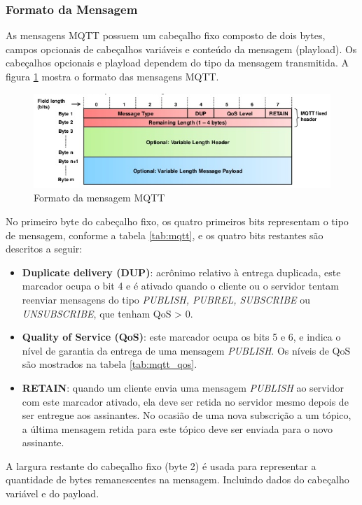 \subsubsection{Formato da Mensagem}

As mensagens MQTT possuem um cabeçalho fixo composto de dois bytes,
campos opcionais de cabeçalhos variáveis e conteúdo da mensagem (playload).
Os cabeçalhos opcionais e playload dependem do tipo da mensagem transmitida.
A figura \ref{fig:mqtt-1} mostra o formato das mensagens MQTT.

\begin{figure}[h]
\begin{centering}
\includegraphics[width=1\linewidth]{Imagens/Cap_2/mqtt_message}
\par\end{centering}
\caption{Formato da mensagem MQTT \cite{img:mqtt:peter}\label{fig:mqtt-1}}
\end{figure}
 

No primeiro byte do cabeçalho fixo, os quatro primeiros bits representam
o tipo de mensagem, conforme a tabela \ref{tab:mqtt}, e os quatro
bits restantes são descritos a seguir:
\begin{itemize}
\item \textbf{Duplicate delivery (DUP)}: acrônimo relativo à entrega duplicada,
este marcador ocupa o bit 4 e é ativado quando o cliente ou o servidor
tentam reenviar mensagens do tipo \emph{PUBLISH, PUBREL, SUBSCRIBE}
ou \emph{UNSUBSCRIBE}, que tenham QoS > 0.
\item \textbf{Quality of Service (QoS)}: este marcador ocupa os bits 5 e
6, e indica o nível de garantia da entrega de uma mensagem \emph{PUBLISH}.
Os níveis de QoS são mostrados na tabela \ref{tab:mqtt_qos}.
\item \textbf{RETAIN}: quando um cliente envia uma mensagem \emph{PUBLISH}
ao servidor com este marcador ativado, ela deve ser retida no servidor
mesmo depois de ser entregue aos assinantes. No ocasião de uma nova
subscrição a um tópico, a última mensagem retida para este tópico
deve ser enviada para o novo assinante.
\end{itemize}
A largura restante do cabeçalho fixo (byte 2) é usada para representar
a quantidade de bytes remanescentes na mensagem. Incluindo dados do
cabeçalho variável e do payload. 

